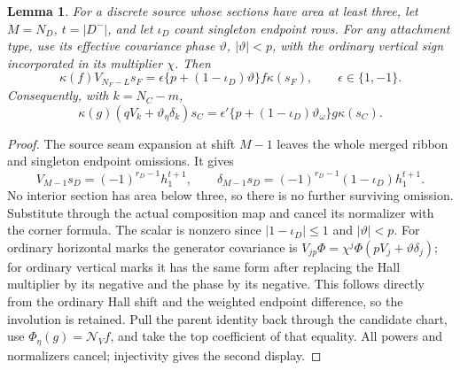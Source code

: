 \documentclass[11pt,a4paper]{amsart}
\numberwithin{equation}{section}
\theoremstyle{plain}
\newtheorem{lemma}[theorem]{Lemma}
\theoremstyle{definition}
\begin{document}
\begin{lemma}\label{lem:long-high-identity}
For a discrete source whose sections have area at least three, let \(M=N_D\), \(t=|D^-|\), and let \(\iota_D\) count singleton endpoint rows.  For any attachment type, use its effective covariance phase \(\vartheta\), \(|\vartheta|<p\), with the ordinary vertical sign incorporated in its multiplier \(\chi\).  Then
\[
 \kappa(f)V_{N_F-L}s_F=\epsilon\{p+(1-\iota_D)\vartheta\}f\kappa(s_F),
 \qquad\epsilon\in\{1,-1\}.
\]
Consequently, with \(k=N_C-m\),
\[
 \kappa(g)(qV_k+\vartheta_\eta\delta_k)s_C
 =\epsilon'\{p+(1-\iota_D)\vartheta_\omega\}g\kappa(s_C).
\]
\end{lemma}
\begin{proof}
The source seam expansion at shift \(M-1\) leaves the whole merged ribbon and singleton endpoint omissions.  It gives
\[
 V_{M-1}s_D=(-1)^{r_D-1}h_1^{t+1},\qquad
 \delta_{M-1}s_D=(-1)^{r_D-1}(1-\iota_D)h_1^{t+1}.
\]
No interior section has area below three, so there is no further surviving omission.  Substitute through the actual composition map and cancel its normalizer with the corner formula.  The scalar is nonzero since \(|1-\iota_D|\le1\) and \(|\vartheta|<p\).  For ordinary horizontal marks the generator covariance is \(V_{jp}\Phi=\chi^j\Phi(pV_j+\vartheta\delta_j)\); for ordinary vertical marks it has the same form after replacing the Hall multiplier by its negative and the phase by its negative.  This follows directly from the ordinary Hall shift and the weighted endpoint difference, so the involution is retained.  Pull the parent identity back through the candidate chart, use \(\Phi_\eta(g)=\mathcal N_Vf\), and take the top coefficient of that equality.  All powers and normalizers cancel; injectivity gives the second display.
\end{proof}
\end{document}
